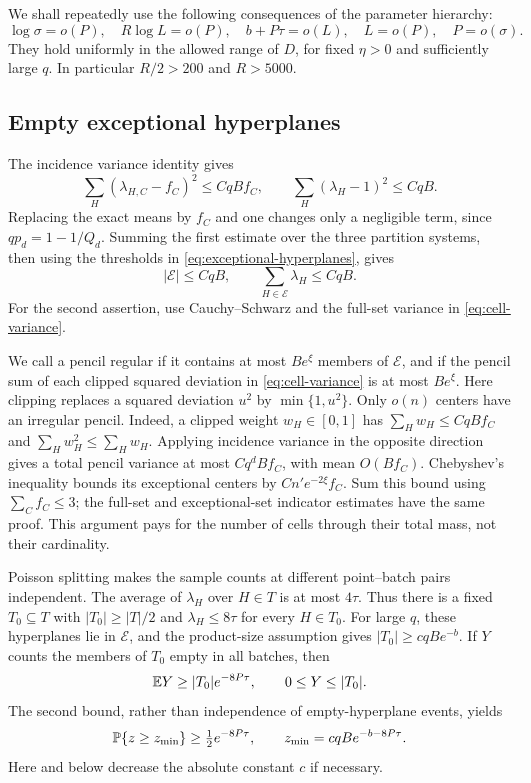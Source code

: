 We shall repeatedly use the following consequences of the parameter
hierarchy:
\begin{equation}
 \log\sigma=o(P),\quad R\log L=o(P),\quad
 b+P\tau=o(L),\quad L=o(P),\quad P=o(\sigma).
 \label{eq:score-parameter-slack}
\end{equation}
They hold uniformly in the allowed range of \(D\), for fixed \(\eta>0\)
and sufficiently large \(q\).  In particular \(R/2>200\) and \(R>5000\).

\subsection{Empty exceptional hyperplanes}
\label{subsec:score-exceptional}

The incidence variance identity gives
\begin{equation}
 \sum_H(\lambda_{H,C}-f_C)^2\le CqBf_C,
 \qquad \sum_H(\lambda_H-1)^2\le CqB.
 \label{eq:cell-variance}
\end{equation}
Replacing the exact means by \(f_C\) and one changes only a negligible
term, since \(qp_d=1-1/Q_d\).  Summing the first estimate over the three
partition systems, then using the thresholds in
\eqref{eq:exceptional-hyperplanes}, gives
\begin{equation}
 |\mathcal E|\le CqB,\qquad
 \sum_{H\in\mathcal E}\lambda_H\le CqB.
 \label{eq:exceptional-mass}
\end{equation}
For the second assertion, use Cauchy--Schwarz and the full-set variance
in \eqref{eq:cell-variance}.

We call a pencil regular if it contains at most \(Be^\xi\) members of
\(\mathcal E\), and if the pencil sum of each clipped squared deviation
in \eqref{eq:cell-variance} is at most \(Be^\xi\). Here clipping replaces
a squared deviation $u^2$ by $\min\{1,u^2\}$.  Only \(o(n)\) centers
have an irregular pencil.  Indeed, a clipped weight \(w_H\in[0,1]\) has
\(\sum_Hw_H\le CqBf_C\) and \(\sum_Hw_H^2\le\sum_Hw_H\).  Applying
incidence variance in the opposite direction gives a total pencil
variance at most \(Cq^dBf_C\), with mean \(O(Bf_C)\).  Chebyshev's
inequality bounds its exceptional centers by \(Cn'e^{-2\xi}f_C\).
Sum this bound using \(\sum_Cf_C\le3\); the full-set and exceptional-set
indicator estimates have the same proof.  This argument pays for the
number of cells through their total mass, not their cardinality.

Poisson splitting makes the sample counts at different point--batch
pairs independent.  The average of \(\lambda_H\) over
\(H\in T\) is at most \(4\tau\).  Thus there is a fixed
\(T_0\subseteq T\) with \(|T_0|\ge|T|/2\) and \(\lambda_H\le8\tau\)
for every \(H\in T_0\).  For large \(q\), these hyperplanes lie in
\(\mathcal E\), and the product-size assumption gives
\(|T_0|\ge cqBe^{-b}\).
If \(Y\) counts the members of \(T_0\) empty in all batches, then
\[
 \mathbb E Y\ge |T_0|e^{-8P\tau},\qquad 0\le Y\le |T_0|.
\]
The second bound, rather than independence of empty-hyperplane events,
yields
\begin{equation}
 \mathbb P\{z\ge z_{\min}\}\ge\tfrac12e^{-8P\tau},
 \qquad z_{\min}=cqB e^{-b-8P\tau}.
 \label{eq:z-event}
\end{equation}
Here and below decrease the absolute constant \(c\) if necessary.

